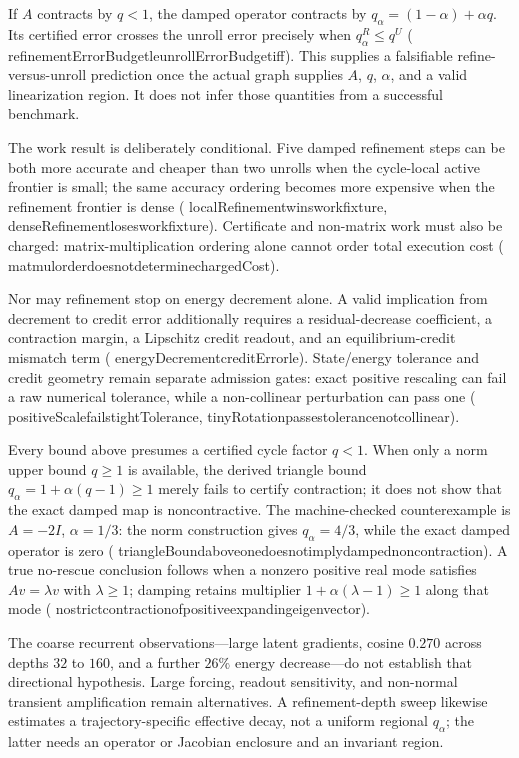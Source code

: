 \documentclass[11pt]{article}
\newcommand{\leanname}[1]{{\scriptsize\ttfamily
  \def\_{\textunderscore\allowbreak}#1}}
\begin{document}
If $A$ contracts by $q<1$, the damped operator contracts by
$q_\alpha=(1-\alpha)+\alpha q$.  Its certified error crosses the unroll error precisely
when $q_\alpha^R\le q^U$
(\leanname{refinementErrorBudget\_le\_unrollErrorBudget\_iff}).  This supplies a
falsifiable refine-versus-unroll prediction once the actual graph supplies $A$, $q$,
$\alpha$, and a valid linearization region.  It does not infer those quantities from a
successful benchmark.

The work result is deliberately conditional.  Five damped refinement steps can be both
more accurate and cheaper than two unrolls when the cycle-local active frontier is small;
the same accuracy ordering becomes more expensive when the refinement frontier is dense
(\leanname{localRefinement\_wins\_work\_fixture},
\leanname{denseRefinement\_loses\_work\_fixture}).  Certificate and non-matrix work must
also be charged: matrix-multiplication ordering alone cannot order total execution cost
(\leanname{matmul\_order\_does\_not\_determine\_chargedCost}).

Nor may refinement stop on energy decrement alone.  A valid implication from decrement
to credit error additionally requires a residual-decrease coefficient, a contraction
margin, a Lipschitz credit readout, and an equilibrium-credit mismatch term
(\leanname{energyDecrement\_creditError\_le}).  State/energy tolerance and credit geometry
remain separate admission gates: exact positive rescaling can fail a raw numerical
tolerance, while a non-collinear perturbation can pass one
(\leanname{positiveScale\_fails\_tightTolerance},
\leanname{tinyRotation\_passes\_tolerance\_not\_collinear}).

Every bound above presumes a certified cycle factor $q<1$.  When only a norm upper bound
$q\ge1$ is available, the derived triangle bound
$q_\alpha=1+\alpha(q-1)\ge1$ merely fails to certify contraction; it does not show that
the exact damped map is noncontractive.  The machine-checked counterexample is
$A=-2I$, $\alpha=1/3$: the norm construction gives $q_\alpha=4/3$, while the exact damped
operator is zero
(\leanname{triangleBound\_above\_one\_does\_not\_imply\_damped\_noncontraction}).
A true no-rescue conclusion follows when a nonzero positive real mode satisfies
$Av=\lambda v$ with $\lambda\ge1$; damping retains multiplier
$1+\alpha(\lambda-1)\ge1$ along that mode
(\leanname{no\_strict\_contraction\_of\_positive\_expanding\_eigenvector}).

The coarse recurrent observations---large latent gradients, cosine $0.270$ across depths
$32$ to $160$, and a further $26\%$ energy decrease---do not establish that directional
hypothesis.  Large forcing, readout sensitivity, and non-normal transient amplification
remain alternatives.  A refinement-depth sweep likewise estimates a trajectory-specific
effective decay, not a uniform regional $q_\alpha$; the latter needs an operator or
Jacobian enclosure and an invariant region.
\end{document}
